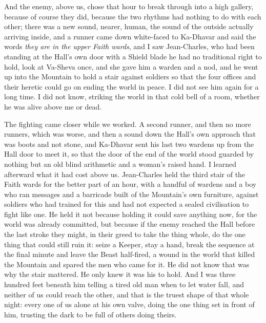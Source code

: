 And the enemy, above us, chose that hour to break through into a high gallery, because of course they did, because the two rhythms had nothing to do with each other; there was a new sound, nearer, human, the sound of the outside actually arriving inside, and a runner came down white-faced to Ka-Dhavar and said the words \emph{they are in the upper Faith wards}, and I saw Jean-Charles, who had been standing at the Hall's own door with a Shield blade he had no traditional right to hold, look at Va-Sheva once, and she gave him a warden and a nod, and he went up into the Mountain to hold a stair against soldiers so that the four offices and their heretic could go on ending the world in peace. I did not see him again for a long time. I did not know, striking the world in that cold bell of a room, whether he was alive above me or dead.\par

The fighting came closer while we worked. A second runner, and then no more runners, which was worse, and then a sound down the Hall's own approach that was boots and not stone, and Ka-Dhavar sent his last two wardens up from the Hall door to meet it, so that the door of the end of the world stood guarded by nothing but an old blind arithmetic and a woman's raised hand. I learned afterward what it had cost above us. Jean-Charles held the third stair of the Faith wards for the better part of an hour, with a handful of wardens and a boy who ran messages and a barricade built of the Mountain's own furniture, against soldiers who had trained for this and had not expected a sealed civilisation to fight like one. He held it not because holding it could save anything now, for the world was already committed, but because if the enemy reached the Hall before the last stroke they might, in their greed to take the thing whole, do the one thing that could still ruin it: seize a Keeper, stay a hand, break the sequence at the final minute and leave the Beast half-fired, a wound in the world that killed the Mountain and spared the men who came for it. He did not know that was why the stair mattered. He only knew it was his to hold. And I was three hundred feet beneath him telling a tired old man when to let water fall, and neither of us could reach the other, and that is the truest shape of that whole night: every one of us alone at his own valve, doing the one thing set in front of him, trusting the dark to be full of others doing theirs.\par

\ornament


